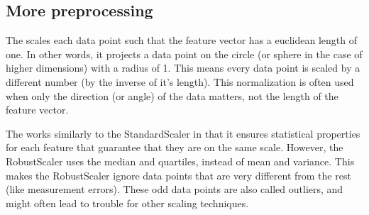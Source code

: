 \documentclass[letterpaper,10pt,english]{sphinxmanual}
\begin{document}
\subsection{More preprocessing}
\label{\detokenize{chapter4:more-preprocessing}}
The  scales each data
point such that the feature vector has a euclidean length of one. In other words, it
projects a data point on the circle (or sphere in the case of higher dimensions) with a
radius of 1. This means every data point is scaled by a different number (by the
inverse of it’s length).
This normalization is often used when only the direction (or angle) of the data matters,
not the length of the feature vector.

The  works similarly to the StandardScaler in that it
ensures statistical properties for each feature that guarantee that
they are on the same scale. However, the RobustScaler uses the median
and quartiles, instead of mean and variance. This makes the
RobustScaler ignore data points that are very different from the rest
(like measurement errors). These odd data points are also called
outliers, and might often lead to trouble for other scaling
techniques.
\end{document}
